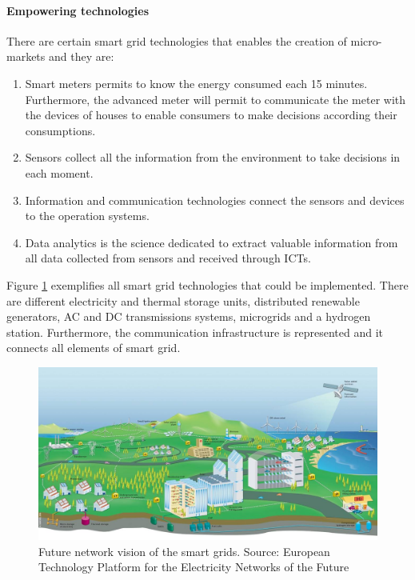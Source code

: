 \documentclass[a4paper,11pt,twoside,openright]{report}
\begin{document}
\paragraph{Empowering technologies}
There are certain smart grid technologies that enables the creation of micro-markets and they are:
\begin{enumerate}
	\item Smart meters permits to know the energy consumed each 15 minutes. Furthermore, the advanced meter will permit to communicate the meter with the devices of houses to enable consumers to make decisions according their consumptions.
	\item Sensors collect all the information from the environment to take decisions in each moment.
	\item Information and communication technologies connect the sensors and devices to the operation systems.
	\item Data analytics is the science dedicated to extract valuable information from all data collected from sensors and received through ICTs.
\end{enumerate}

Figure \ref{fig:smart_grid_view} exemplifies all smart grid technologies that could be implemented. There are different electricity and thermal storage units, distributed renewable generators, AC and DC transmissions systems, microgrids and a hydrogen station. Furthermore, the communication infrastructure is represented and it connects all elements of smart grid.

\begin{figure}[h!]
	\centering
	\includegraphics[scale=0.5]{figures/smart_grid_vision}
	\caption{Future network vision of the smart grids. Source: European Technology Platform for the Electricity Networks of the Future \cite{ETP_SG2006}}
	\label{fig:smart_grid_view}
\end{figure}
\end{document}
